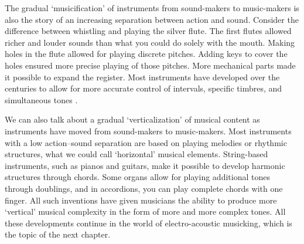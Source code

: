 The gradual `musicification' of instruments from sound-makers to music-makers is also the story of an increasing separation between action and sound. Consider the difference between whistling and playing the silver flute. The first flutes allowed richer and louder sounds than what you could do solely with the mouth. Making holes in the flute allowed for playing discrete pitches. Adding keys to cover the holes ensured more precise playing of those pitches. More mechanical parts made it possible to expand the register. Most instruments have developed over the centuries to allow for more accurate control of intervals, specific timbres, and simultaneous tones \citep{keislar_historical_2009}.

We can also talk about a gradual `verticalization' of musical content as instruments have moved from sound-makers to music-makers. Most instruments with a low action--sound separation are based on playing melodies or rhythmic structures, what we could call `horizontal' musical elements. String-based instruments, such as pianos and guitars, make it possible to develop harmonic structures through chords. Some organs allow for playing additional tones through doublings, and in accordions, you can play complete chords with one finger. All such inventions have given musicians the ability to produce more `vertical' musical complexity in the form of more and more complex tones. All these developments continue in the world of electro-acoustic musicking, which is the topic of the next chapter.
